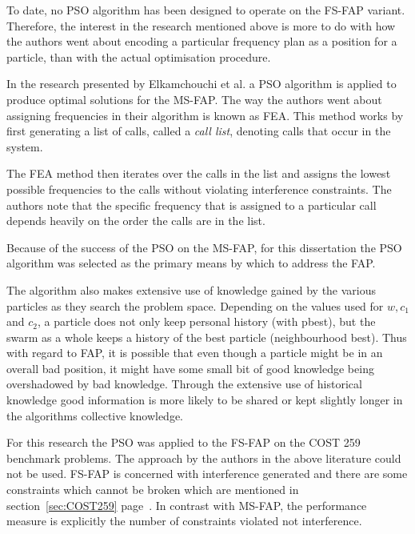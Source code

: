 To date, no \gls{PSO} algorithm has been designed to operate on the \gls{FS-FAP} variant. Therefore, the interest in the research mentioned above is more to do with how the authors went about encoding a particular frequency plan as a position for a particle, than with the actual optimisation procedure.

In the research presented by Elkamchouchi et al.\cite{EgyptFAPPSO} a \gls{PSO} algorithm is applied to produce optimal solutions for the \gls{MS-FAP}. The way the authors went about assigning frequencies in their algorithm is known as \gls{FEA}.
This method works by first generating a list of calls, called a \emph{call list}, denoting calls that occur in the system\cite{EgyptFAPPSO}. 

The \gls{FEA} method then iterates over the calls in the list and assigns the lowest possible frequencies to the calls without violating interference constraints\cite{EgyptFAPPSO}. The authors note that the specific frequency that is assigned to a particular call depends heavily on the order the calls are in the list\cite{EgyptFAPPSO}.

Because of the success of the \gls{PSO} on the \gls{MS-FAP}, for this dissertation the \gls{PSO} algorithm was selected as the primary means by which to address the \gls{FAP}.

The algorithm also makes extensive use of knowledge gained by the various particles as they search the problem space. Depending on the values used for $w, c_1$ and $c_2$, a particle does not only keep personal history (with pbest), but the swarm as a whole keeps a history of the best particle (neighbourhood best). Thus with regard to \gls{FAP}, it is possible that even though a particle might be in an overall bad position, it might have some small bit of good knowledge being overshadowed by bad knowledge. Through the extensive use of historical knowledge good information is more likely to be shared or kept slightly longer in the algorithms collective knowledge.

For this research the \gls{PSO} was applied to the \gls{FS-FAP} on the \gls{COST} 259 benchmark problems. The approach by the authors in the above literature could not be used. \gls{FS-FAP} is concerned with interference generated and there are some constraints which cannot be broken which are mentioned in section~\ref{sec:COST259} page~\pageref{sec:COST259}. In contrast with \gls{MS-FAP}, the performance measure is explicitly the number of constraints violated not interference.

